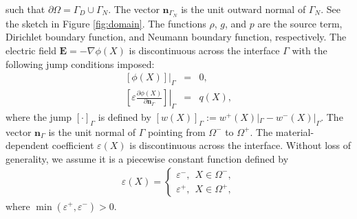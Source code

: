 \documentclass{siamart171218}
\begin{document}
such that $\partial\Omega = \Gamma_D \cup \Gamma_N$.
The vector $\textbf{n}_{\Gamma_N}$ is the unit outward normal of $\Gamma_N$.
See the sketch in Figure \ref{fig:domain}.
The functions $\rho$, $g$, and $p$ are
the source term, Dirichlet boundary function, and Neumann boundary function, respectively.
The electric field $\mathbf{E} = -\nabla \phi(X)$ is discontinuous
across the interface $\Gamma$ with the following jump conditions imposed:
\begin{eqnarray}
\left. \left[\phi(X) \right] \right|_\Gamma &=& 0,
\label{eq:bvp_int_1_nonhomogeneous flux jump} \\
\left. \left[
\varepsilon \frac{\partial \phi(X)}{\partial\textbf{n}_{\Gamma}}
\right]
\right|_{\Gamma}
&=& q(X),
\label{eq:bvp_int_2_nonhomogeneous flux jump}
\end{eqnarray}
where the jump $[\cdot]_\Gamma$ is defined by
$[w(X)]_\Gamma := w^+(X)|_\Gamma - w^-(X)|_\Gamma$.
The vector $\textbf{n}_{\Gamma}$ is the unit normal of $\Gamma$
pointing from $\Omega^-$ to $\Omega^+$.
The material-dependent coefficient $\varepsilon{(X)}$ is discontinuous across the interface.
Without loss of generality, we assume it is a piecewise constant function defined by
\begin{eqnarray*}
\varepsilon(X) = \left\{ \begin{array} {ll}
\varepsilon^-, ~~X \in \Omega^-, \\
\varepsilon^+, ~~X \in \Omega^+,
\end{array} \right.
\end{eqnarray*}
where $\min(\varepsilon^+,\varepsilon^-) >0$.
\end{document}
